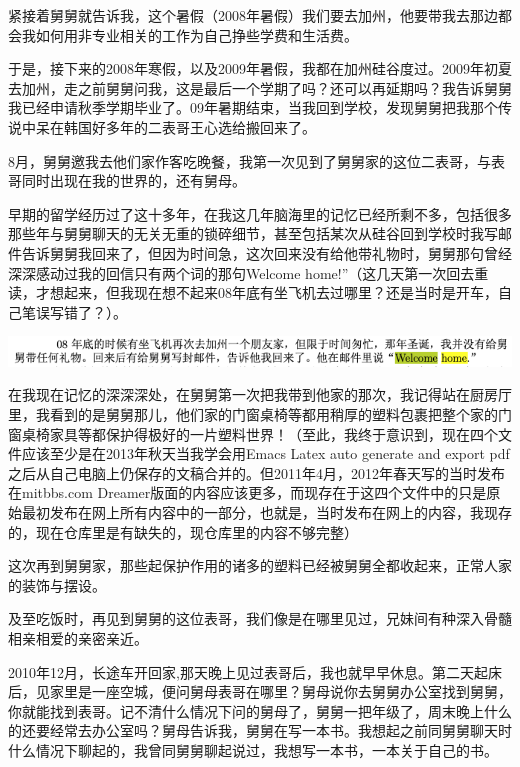 \documentclass[9pt, b5paper]{article}
\begin{document}
紧接着舅舅就告诉我，这个暑假（2008年暑假）我们要去加州，他要带我去那边都会我如何用非专业相关的工作为自己挣些学费和生活费。

于是，接下来的2008年寒假，以及2009年暑假，我都在加州硅谷度过。2009年初夏去加州，走之前舅舅问我，这是最后一个学期了吗？还可以再延期吗？我告诉舅舅我已经申请秋季学期毕业了。09年暑期结束，当我回到学校，发现舅舅把我那个传说中呆在韩国好多年的二表哥王心选给搬回来了。

8月，舅舅邀我去他们家作客吃晚餐，我第一次见到了舅舅家的这位二表哥，与表哥同时出现在我的世界的，还有舅母。

早期的留学经历过了这十多年，在我这几年脑海里的记忆已经所剩不多，包括很多那些年与舅舅聊天的无关无重的锁碎细节，甚至包括某次从硅谷回到学校时我写邮件告诉舅舅我回来了，但因为时间急，这次回来没有给他带礼物时，舅舅那句曾经深深感动过我的回信只有两个词的那句Welcome home!”（这几天第一次回去重读，才想起来，但我现在想不起来08年底有坐飞机去过哪里？还是当时是开车，自己笔误写错了？）。

\begin{center}
\includegraphics[width=.9\linewidth]{./pic/p1p34.png}
\end{center}

在我现在记忆的深深深处，在舅舅第一次把我带到他家的那次，我记得站在厨房厅里，我看到的是舅舅那儿，他们家的门窗桌椅等都用稍厚的塑料包裹把整个家的门窗桌椅家具等都保护得极好的一片塑料世界！（至此，我终于意识到，现在四个文件应该至少是在2013年秋天当我学会用Emacs Latex auto generate and export pdf之后从自己电脑上仍保存的文稿合并的。但2011年4月，2012年春天写的当时发布在mitbbs.com Dreamer版面的内容应该更多，而现存在于这四个文件中的只是原始最初发布在网上所有内容中的一部分，也就是，当时发布在网上的内容，我现存的，现在仓库里是有缺失的，现仓库里的内容不够完整）

这次再到舅舅家，那些起保护作用的诸多的塑料已经被舅舅全都收起来，正常人家的装饰与摆设。

及至吃饭时，再见到舅舅的这位表哥，我们像是在哪里见过，兄妹间有种深入骨髓相亲相爱的亲密亲近。

2010年12月，长途车开回家,那天晚上见过表哥后，我也就早早休息。第二天起床后，见家里是一座空城，便问舅母表哥在哪里？舅母说你去舅舅办公室找到舅舅，你就能找到表哥。记不清什么情况下问的舅母了，舅舅一把年级了，周末晚上什么的还要经常去办公室吗？舅母告诉我，舅舅在写一本书。我想起之前同舅舅聊天时什么情况下聊起的，我曾同舅舅聊起说过，我想写一本书，一本关于自己的书。
\end{document}
